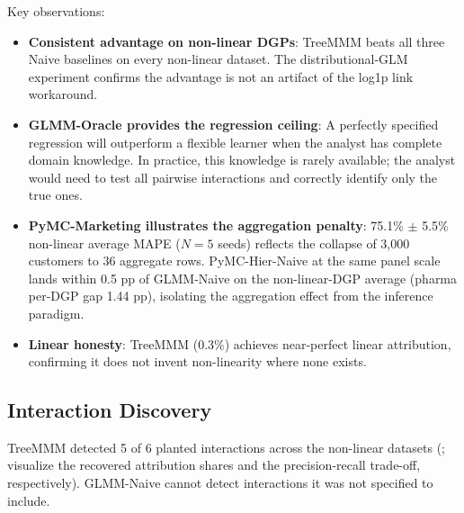 \documentclass[review,12pt]{elsarticle}
\begin{document}
Key observations:
\begin{itemize}
\item \textbf{Consistent advantage on non-linear DGPs}: TreeMMM beats all three
  Naive baselines on every non-linear dataset. The distributional-GLM experiment
  confirms the advantage is not an artifact of the log1p link workaround.
\item \textbf{GLMM-Oracle provides the regression ceiling}: A perfectly
  specified regression will outperform a flexible learner when the analyst has
  complete domain knowledge. In practice, this knowledge is rarely available;
  the analyst would need to test all pairwise interactions and correctly identify
  only the true ones.
\item \textbf{PyMC-Marketing illustrates the aggregation penalty}: 75.1\% $\pm$
  5.5\% non-linear average MAPE ($N{=}5$ seeds) reflects the collapse of 3,000
  customers to 36 aggregate rows. PyMC-Hier-Naive at the same panel scale lands
  within 0.5 pp of GLMM-Naive on the non-linear-DGP average (pharma per-DGP gap
  1.44 pp), isolating the aggregation effect from the inference paradigm.
\item \textbf{Linear honesty}: TreeMMM (0.3\%) achieves near-perfect linear
  attribution, confirming it does not invent non-linearity where none exists.
\end{itemize}

\subsection{Interaction Discovery}
\label{sec:results:interaction}

TreeMMM detected 5 of 6 planted interactions across the non-linear datasets
(;
 visualize the recovered attribution
shares and the precision-recall trade-off, respectively). GLMM-Naive cannot
detect interactions it was not specified to include.
\end{document}

